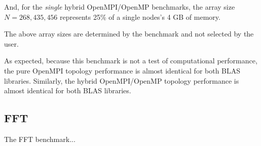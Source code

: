 And, for the \emph{single} hybrid OpenMPI/OpenMP benchmarks, the array size $N = 268,435,456$ represents 25\% of a single nodes's 4 GB of memory.

The above array sizes are determined by the benchmark and not selected by the user.

As expected, because this benchmark is not a test of computational performance, the pure OpenMPI topology performance is almost identical for both BLAS libraries. Similarly, the hybrid OpenMPI/OpenMP topology performance is almost identical for both BLAS libraries.

 


%
%
\subsection{FFT}

The FFT benchmark...

